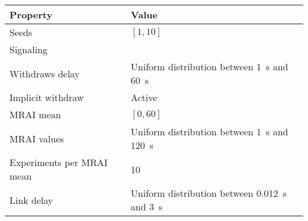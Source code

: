 \begin{center}
	\begin{tabular}{ || m{4.9cm}| m{7.3cm} || } 
	\hline
	Property & Value \\ 
	\hline \hline
	Seeds & $[1, 10]$ \\ 
	\hline
	Signaling & \q{AW} \\
	\hline
		Withdraws delay & Uniform distribution between \SI{1}{\second} and \SI{60}{\second} \\ 
	\hline
		Implicit withdraw & Active \\ 
	\hline
		MRAI mean & $[0, 60]$ \\
	\hline
		MRAI values & Uniform distribution between \SI{1}{\second} and \SI{120}{\second} \\
	\hline
		Experiments per \ac{MRAI} mean & \num{10} \\
	\hline
	Link delay & Uniform distribution between \SI{0.012}{\second} and \SI{3}{\second} \\
	\hline

	\end{tabular}
\end{center}
